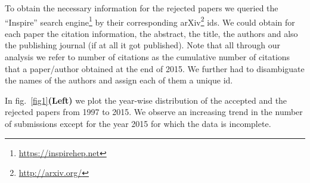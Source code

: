  To obtain the necessary information for the rejected papers we queried the ``Inspire'' search engine\footnote{\url{https://inspirehep.net}} by their corresponding arXiv\footnote{\url{http://arxiv.org/}} ids. We could obtain for each paper the citation information, the abstract, the title, the authors and also the publishing journal (if at all it got published). Note that all through our analysis we refer to number of citations as the cumulative number of citations that a paper/author obtained at the end of 2015. 
We further had to disambiguate the names of the authors and assign each of them a unique id.  

 In fig.~\ref{fig1}{\bf(Left)} we plot the year-wise distribution of the accepted and the rejected papers from 1997 to 2015. We observe an increasing trend in the number of submissions except for the year 2015 for which the data is incomplete. 
\begin{table}[htpb]
\centering
\caption{General information of the dataset.}
\label{tab1}
\end{table}

